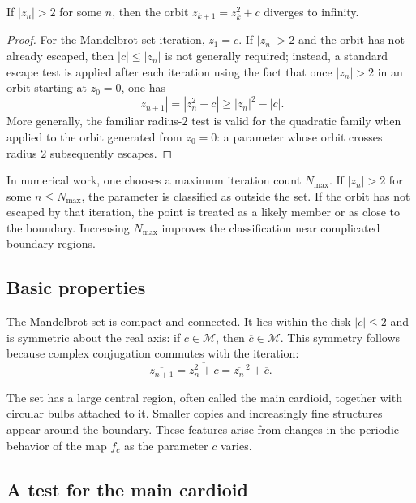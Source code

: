 \documentclass[a4paper, 10pt, onepage]{elegantbook}
\begin{document}
{\begin{theorem}
If $|z_n|>2$ for some $n$, then the orbit
$z_{k+1}=z_k^2+c$ diverges to infinity.
\end{theorem}

\begin{proof}
For the Mandelbrot-set iteration, $z_1=c$. If $|z_n|>2$ and the orbit
has not already escaped, then $|c|\leq |z_n|$ is not generally
required; instead, a standard escape test is applied after each
iteration using the fact that once $|z_n|>2$ in an orbit starting at
$z_0=0$, one has
\[
  |z_{n+1}|=|z_n^2+c|
  \geq |z_n|^2-|c|.
\]
More generally, the familiar radius-$2$ test is valid for the
quadratic family when applied to the orbit generated from $z_0=0$:
a parameter whose orbit crosses radius $2$ subsequently escapes.
\end{proof}

In numerical work, one chooses a maximum iteration count
$N_{\max}$. If $|z_n|>2$ for some $n\leq N_{\max}$, the parameter is
classified as outside the set. If the orbit has not escaped by that
iteration, the point is treated as a likely member or as close to the
boundary. Increasing $N_{\max}$ improves the classification near
complicated boundary regions.

\subsection{Basic properties}

\noindent

The Mandelbrot set is compact and connected. It lies within the disk
$|c|\leq 2$ and is symmetric about the real axis: if $c\in\mathcal{M}$,
then $\overline{c}\in\mathcal{M}$. This symmetry follows because
complex conjugation commutes with the iteration:
\[
  \overline{z_{n+1}}
  =\overline{z_n^2+c}
  =\overline{z_n}^{\,2}+\overline{c}.
\]

The set has a large central region, often called the main
cardioid, together with circular bulbs attached to it. Smaller copies
and increasingly fine structures appear around the boundary. These
features arise from changes in the periodic behavior of the map
$f_c$ as the parameter $c$ varies.

\subsection{A test for the main cardioid}

}
\end{document}
